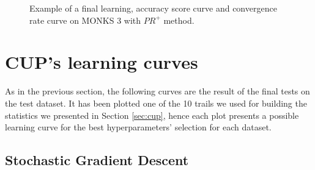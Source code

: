 \begin{appendices}
\begin{figure}[H]
\begin{subfigure}{0.40\textwidth}
                    \label{fig:monks_3_ACC_CGD}
                \end{subfigure}
                \begin{subfigure}{0.40\textwidth}
                    \caption{}
                    \label{fig:monks_3_NORM_CGD}
                \end{subfigure}
                \caption{Example of a final learning, accuracy score curve and
                convergence rate curve on MONKS 3 with $PR^+$ method.}
                \label{fig:monks_3_CGD}
            \end{figure}




    \chapter{CUP's learning curves} %
    \label{cha:cup_learning_curves}
        As in the previous section, the following curves are the result of the final tests on the test dataset. It has been plotted one of the 10 trails we used for building the statistics we presented in Section \ref{sec:cup}, hence each plot presents a possible learning curve for the best hyperparameters’ selection for each dataset.
        \section{Stochastic Gradient Descent} %
        \label{sec:cup_sgd}


\end{appendices}

